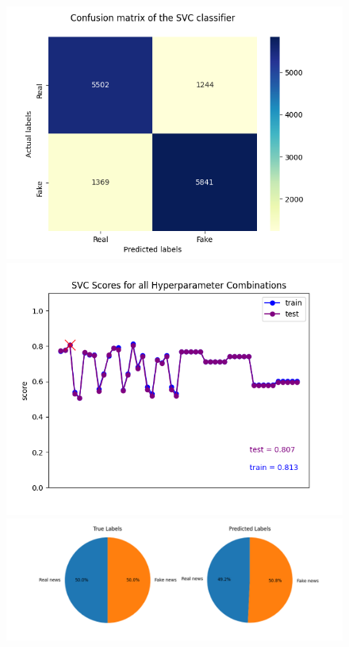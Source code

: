 \documentclass[10pt,twocolumn,letterpaper]{article}
\begin{document}
\begin{figure}[h]
   \begin{center}
        \includegraphics[scale=0.6]{graphs/SVC/confusion_matrix.png}
        \includegraphics[scale=0.6]{graphs/SVC/scores_plot.png}
        \includegraphics[scale=0.6]{graphs/SVC/piechart.png}
   \end{center}
        \vspace*{-5mm}
        \caption{\label{fourth_figure}}
\end{figure}
\end{document}
